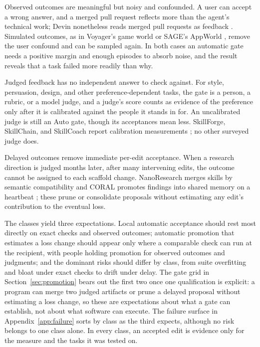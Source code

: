 Observed outcomes are meaningful but noisy and confounded. A user can accept a wrong answer, and a merged pull request reflects more than the agent's technical work; Devin nonetheless reads merged pull requests as feedback \citep{cognition2025devinreview}. Simulated outcomes, as in Voyager's game world or SAGE's AppWorld \citep{wang2025sage}, remove the user confound and can be sampled again. In both cases an automatic gate needs a positive margin and enough episodes to absorb noise, and the result reveals that a task failed more readily than why.

Judged feedback has no independent answer to check against. For style, persuasion, design, and other preference-dependent tasks, the gate is a person, a rubric, or a model judge, and a judge's score counts as evidence of the preference only after it is calibrated against the people it stands in for. An uncalibrated judge is still an Auto gate, though its acceptances mean less. SkillForge, SkillChain, and SkillCoach report calibration measurements \citep{skillforge2026, hu2026skillchain, zhu2026skillcoach}; no other surveyed judge does.

Delayed outcomes remove immediate per-edit acceptance. When a research direction is judged months later, after many intervening edits, the outcome cannot be assigned to each scaffold change. NanoResearch merges skills by semantic compatibility \citep{xu2026nanoresearch} and CORAL promotes findings into shared memory on a heartbeat \citep{qu2026coral}; these prune or consolidate proposals without estimating any edit's contribution to the eventual loss.

The classes yield three expectations. Local automatic acceptance should rest most directly on exact checks and observed outcomes; automatic promotion that estimates a loss change should appear only where a comparable check can run at the recipient, with people holding promotion for observed outcomes and judgments; and the dominant risks should differ by class, from suite overfitting and bloat under exact checks to drift under delay. The gate grid in Section~\ref{sec:promotion} bears out the first two once one qualification is explicit: a program can merge two judged artifacts or prune a delayed proposal without estimating a loss change, so these are expectations about what a gate can establish, not about what software can execute. The failure surface in Appendix~\ref{app:failure} sorts by class as the third expects, although no risk belongs to one class alone. In every class, an accepted edit is evidence only for the measure and the tasks it was tested on.

